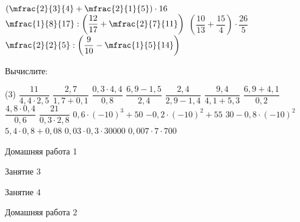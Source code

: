 \begin{class}[number=2]
\begin{listofex}
\begin{tasks}
			\task \( \left( \mfrac{2}{3}{4}+\mfrac{2}{1}{5} \right)\cdot16 \)
			\task \( \mfrac{1}{8}{17}:\left( \dfrac{12}{17}+\mfrac{2}{7}{11} \right) \)
			\task \( \left( \dfrac{10}{13}+\dfrac{15}{4} \right)\cdot\dfrac{26}{5} \)
			\task \( \mfrac{2}{2}{5}:\left( \dfrac{9}{10}-\mfrac{1}{5}{14} \right) \)
		\end{tasks}
	\newpage
		\item Вычислите:
		\begin{tasks}(3)
			\task \( \dfrac{11}{4,4\cdot2,5} \)
			\task \( \dfrac{2,7}{1,7+0,1} \)
			\task \( \dfrac{0,3\cdot4,4}{0,8} \)
			\task \( \dfrac{6,9-1,5}{2,4} \)
			\task \( \dfrac{2,4}{2,9-1,4} \)
			\task \( \dfrac{9,4}{4,1+5,3} \)
			\task \( \dfrac{6,9+4,1}{0,2} \)
			\task \( \dfrac{4,8\cdot0,4}{0,6} \)
			\task \( \dfrac{21}{0,3\cdot2,8} \)
			\task \( 0,6\cdot(-10)^3+50 \)
			\task \( -0,2\cdot(-10)^2+55 \)
			\task \( 30-0,8\cdot(-10)^2 \)
			\task \( 5,4\cdot0,8+0,08 \)
			\task \( 0,03\cdot0,3\cdot30000 \)
			\task \( 0,007\cdot7\cdot700 \)
		\end{tasks}
	\end{listofex}
\end{class}

\begin{homework}[number=1]
	\begin{listofex}
		\item Домашняя работа 1
	\end{listofex}
\end{homework}

\begin{class}[number=3]
	\begin{listofex}
		\item Занятие 3 
	\end{listofex}
\end{class}

\begin{class}[number=4]
	\begin{listofex}
		\item Занятие 4
	\end{listofex}
\end{class}

\begin{homework}[number=2]
	\begin{listofex}
		\item Домашняя работа 2
	\end{listofex}
\end{homework}

